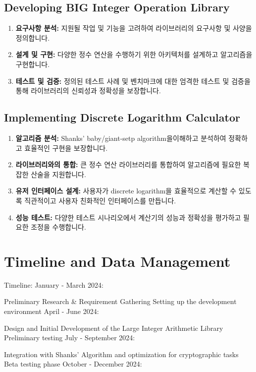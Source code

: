 \documentclass[12pt,a4paper]{article}
\begin{document}
	\subsection{Developing BIG Integer Operation Library}
	\begin{enumerate}
		\item \textbf{요구사항 분석:} 지원될 작업 및 기능을 고려하여 라이브러리의 요구사항 및 사양을 정의합니다.
		\item \textbf{설계 및 구현:} 다양한 정수 연산을 수행하기 위한 아키텍처를 설계하고 알고리즘을 구현합니다.
		\item \textbf{테스트 및 검증:} 정의된 테스트 사례 및 벤치마크에 대한 엄격한 테스트 및 검증을 통해 라이브러리의 신뢰성과 정확성을 보장합니다.
	\end{enumerate}
	
	\subsection{Implementing Discrete Logarithm Calculator}
	\begin{enumerate}
		\item \textbf{알고리즘 분석:} Shanks' baby/giant-setp algorithm을이해하고 분석하여 정확하고 효율적인 구현을 보장합니다.
		\item \textbf{라이브러리와의 통합:} 큰 정수 연산 라이브러리를 통합하여 알고리즘에 필요한 복잡한 산술을 지원합니다.
		\item \textbf{유저 인터페이스 설계:} 사용자가 discrete logarithm을 효율적으로 계산할 수 있도록 직관적이고 사용자 친화적인 인터페이스를 만듭니다.
		\item \textbf{성능 테스트:} 다양한 테스트 시나리오에서 계산기의 성능과 정확성을 평가하고 필요한 조정을 수행합니다.
	\end{enumerate}
	
	\newpage
	\section{Timeline and Data Management}
	Timeline:
	January - March 2024:
	
	Preliminary Research \& Requirement Gathering
	Setting up the development environment
	April - June 2024:
	
	Design and Initial Development of the Large Integer Arithmetic Library
	Preliminary testing
	July - September 2024:
	
	Integration with Shanks' Algorithm and optimization for cryptographic tasks
	Beta testing phase
	October - December 2024:
	
\end{document}
